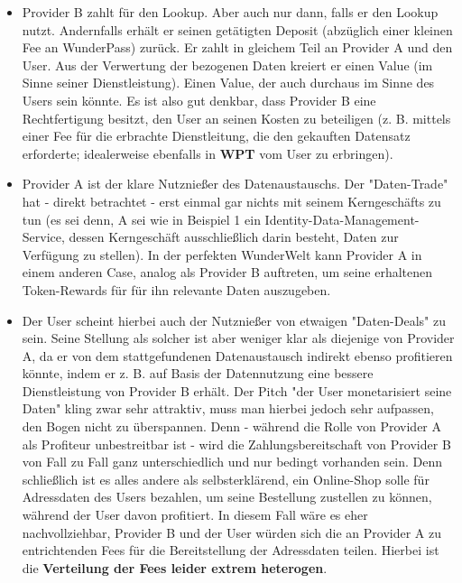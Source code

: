 \begin{Solution}
\begin{itemize}
  \item Provider B zahlt für den Lookup. Aber auch nur dann, falls er den Lookup nutzt. Andernfalls erhält er seinen getätigten Deposit (abzüglich einer kleinen Fee an WunderPass) zurück. Er zahlt in gleichem Teil an Provider A und den User. Aus der Verwertung der bezogenen Daten kreiert er einen Value (im Sinne seiner Dienstleistung). Einen Value, der auch durchaus im Sinne des Users sein könnte. Es ist also gut denkbar, dass Provider B eine Rechtfertigung besitzt, den User an seinen Kosten zu beteiligen (z. B. mittels einer Fee für die erbrachte Dienstleitung, die den gekauften Datensatz erforderte; idealerweise ebenfalls in \textbf{WPT} vom User zu erbringen).
  \item Provider A ist der klare Nutznießer des Datenaustauschs. Der "Daten-Trade" hat - direkt betrachtet - erst einmal gar nichts mit seinem Kerngeschäfts zu tun (es sei denn, A sei wie in Beispiel 1 ein Identity-Data-Management-Service, dessen Kerngeschäft ausschließlich darin besteht, Daten zur Verfügung zu stellen). In der perfekten WunderWelt kann Provider A in einem anderen Case, analog als Provider B auftreten, um seine erhaltenen Token-Rewards für für ihn relevante Daten auszugeben.
  \item Der User scheint hierbei auch der Nutznießer von etwaigen "Daten-Deals" zu sein. Seine Stellung als solcher ist aber weniger klar als diejenige von Provider A, da er von dem stattgefundenen Datenaustausch indirekt ebenso profitieren könnte, indem er z. B. auf Basis der Datennutzung eine bessere Dienstleistung von Provider B erhält. Der Pitch "der User monetarisiert seine Daten" kling zwar sehr attraktiv, muss man hierbei jedoch sehr aufpassen, den Bogen nicht zu überspannen. Denn - während die Rolle von Provider A als Profiteur unbestreitbar ist - wird die Zahlungsbereitschaft von Provider B von Fall zu Fall ganz unterschiedlich und nur bedingt vorhanden sein. Denn schließlich ist es alles andere als selbsterklärend, ein Online-Shop solle für Adressdaten des Users bezahlen, um seine Bestellung zustellen zu können, während der User davon profitiert. In diesem Fall wäre es eher nachvollziehbar, Provider B und der User würden sich die an Provider A zu entrichtenden Fees für die Bereitstellung der Adressdaten teilen. Hierbei ist die \textbf{Verteilung der Fees leider extrem heterogen}.
\end{itemize} 

\end{Solution}


